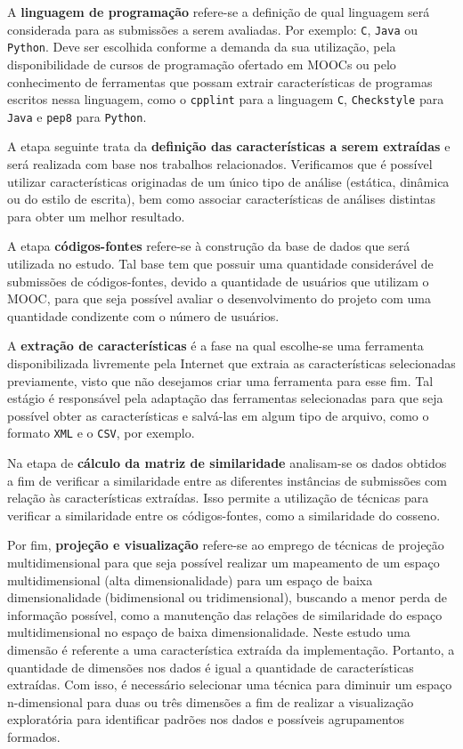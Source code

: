 	 	A \textbf{linguagem de programação} refere-se a definição de qual linguagem será
	 	considerada para as submissões a serem avaliadas. Por exemplo: \texttt{C}, \texttt{Java}
	 	ou \texttt{Python}. Deve ser escolhida conforme a demanda da sua utilização, pela
	 	disponibilidade de cursos de programação ofertado em \acs{MOOC}s ou pelo conhecimento
	 	de ferramentas que possam extrair características de programas escritos nessa linguagem, como o
	 	\texttt{cpplint} para a linguagem \texttt{C}, \texttt{Checkstyle} para
	 	\texttt{Java} e \texttt{pep8} para \texttt{Python}.
	 	
	 	A etapa seguinte trata da \textbf{definição das características a serem extraídas} e será
	 	realizada com base nos trabalhos relacionados. Verificamos
	 	que é possível utilizar características originadas de um único tipo de análise
	 	(estática, dinâmica ou do estilo de escrita), bem como associar características
	 	de análises distintas para obter um melhor resultado.
	 	
	 	A etapa \textbf{códigos-fontes} refere-se à construção da base de dados que será
	 	utilizada no estudo. Tal base tem que possuir uma quantidade considerável de
	 	submissões de códigos-fontes, devido a quantidade de usuários que utilizam o \acs{MOOC},
	 	para que seja possível avaliar o desenvolvimento do projeto com uma quantidade
	 	condizente com o número de usuários.
	 	
	 	A \textbf{extração de características} é a fase na qual escolhe-se uma ferramenta
	 	disponibilizada livremente pela Internet que extraia as características selecionadas
	 	previamente, visto que não desejamos criar uma ferramenta para esse fim. Tal estágio
	 	é responsável pela adaptação das ferramentas selecionadas para que seja
	 	possível obter as características e salvá-las em algum tipo de arquivo, como o
	 	formato \texttt{XML} e o \texttt{CSV}, por exemplo.
	 	
	 	Na etapa de \textbf{cálculo da matriz de similaridade} analisam-se os dados obtidos a
	 	fim de verificar a similaridade entre as diferentes instâncias de submissões com relação
	 	às características extraídas. Isso permite a utilização de técnicas para verificar a similaridade
	 	entre os códigos-fontes, como a similaridade do cosseno.
	 	
	 	Por fim, \textbf{projeção e visualização} refere-se ao emprego de técnicas de
	 	projeção multidimensional para que seja possível realizar um mapeamento de um
	 	espaço multidimensional (alta dimensionalidade) para um espaço de baixa
	 	dimensionalidade (bidimensional ou tridimensional), buscando a menor perda de
	 	informação possível, como a manutenção das relações de similaridade do espaço
	 	multidimensional no espaço de baixa dimensionalidade. Neste estudo uma dimensão
	 	é referente a uma característica extraída da implementação. Portanto, a quantidade
	 	de dimensões nos dados é igual a quantidade de características extraídas. Com isso,
	 	é necessário selecionar uma técnica para diminuir um espaço n-dimensional para
	 	duas ou três dimensões a fim de realizar a visualização exploratória para
	 	identificar padrões nos dados e possíveis agrupamentos formados.
	 	

